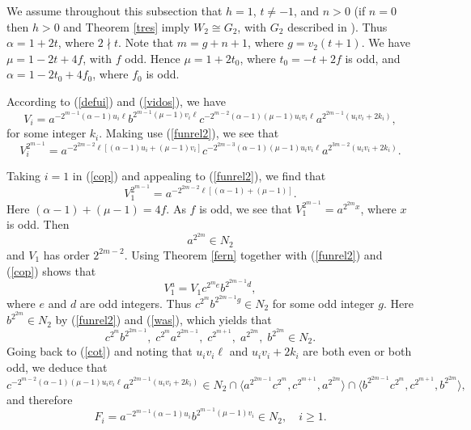 \documentclass{amsart}
\theoremstyle{definition}
\theoremstyle{remark}
\begin{document}
{\medskip

 We assume throughout this subsection that $h=1$,  $t\neq -1$,
and $n>0$ (if $n=0$ then $h>0$ and Theorem \ref{tres} imply $W_2\cong G_2$, with $G_2$ described in \cite{MS}).
Thus $\alpha=1+2t$, where $2\nmid t$. Note that $m=g+n+1$, where $g=v_2(t+1)$.
We have $\mu=1-2 t+ 4 f$, with $f$ odd. Hence $\mu=1+2 t_0$,
where $t_0=-t+2 f$ is odd, and  $\alpha=1-2t_0+4f_0$, where $f_0$ is odd.


According to (\ref{defui}) and (\ref{vidos}), we have
\begin{equation}
\label{cot}
V_i=a^{-2^{m-1}(\alpha-1)u_i\ell}b^{2^{m-1}(\mu-1)v_i\ell}c^{-2^{m-2}(\alpha-1)(\mu-1)u_iv_i\ell}a^{2^{2m-1}(u_iv_i+2k_i)},
\end{equation}
for some integer $k_i$. Making use (\ref{funrel2}), we see  that
\begin{equation}
\label{cop}
V_i^{2^{m-1}}=a^{-2^{2m-2}\ell[(\alpha-1)u_i+(\mu-1)v_i]}c^{-2^{2m-3}(\alpha-1)(\mu-1)u_iv_i\ell}a^{2^{3m-2}(u_iv_i+2k_i)}.
\end{equation}

Taking $i=1$ in (\ref{cop}) and appealing to (\ref{funrel2}), we find that
$$
V_1^{2^{m-1}}=a^{-2^{2m-2}\ell[(\alpha-1)+(\mu-1)]}.
$$
Here $(\alpha-1)+(\mu-1)=4f$. As $f$ is odd, we see that $V_1^{2^{m-1}}=a^{2^{2m}x}$, where $x$ is odd.
Then
\begin{equation}
\label{was}
a^{2^{2m}}\in N_2
\end{equation}
and $V_1$ has order $2^{2m-2}$. Using Theorem \ref{fern} together with (\ref{funrel2}) and  (\ref{cop}) shows that
$$
V_1^a=V_1 c^{2^m e} b^{2^{2m-1} d},
$$
where $e$ and $d$ are odd integers. Thus $c^{2^m} b^{2^{2m-1} g}\in N_2$ for some odd integer $g$.
Here $b^{2^{2m}}\in N_2$ by (\ref{funrel2}) and (\ref{was}), which yields that 
\begin{equation}
\label{was2}
c^{2^m} b^{2^{2m-1}},\; c^{2^m} a^{2^{2m-1}},\; c^{2^{m+1}},\;a^{2^{2m}},\; b^{2^{2m}}\in N_2.
\end{equation}
Going back to (\ref{cot}) and noting that $u_iv_i\ell$ and
$u_iv_i+2k_i$ are both even or both odd, we deduce that 
\begin{equation}
\label{was3}
c^{-2^{m-2}(\alpha-1)(\mu-1)u_iv_i\ell}a^{2^{2m-1}(u_iv_i+2k_i)}\in N_2\cap \langle a^{2^{2m-1}}c^{2^m}, c^{2^{m+1}}, a^{2^{2m}}\rangle
\cap \langle b^{2^{2m-1}}c^{2^m}, c^{2^{m+1}}, b^{2^{2m}}\rangle,
\end{equation}
and therefore
$$
F_i=a^{-2^{m-1}(\alpha-1)u_i}b^{2^{m-1}(\mu-1)v_i}\in N_2,\quad i\geq 1.
$$

}
\end{document}
